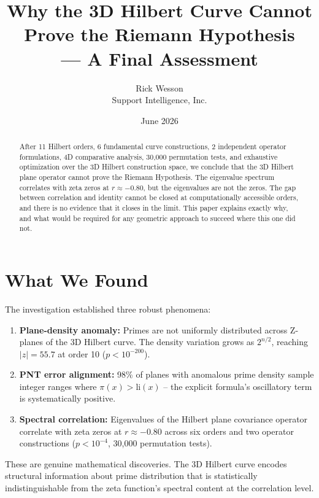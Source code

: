 \documentclass[11pt,a4paper]{article}
\title{Why the 3D Hilbert Curve Cannot Prove the Riemann Hypothesis\\
--- A Final Assessment}
\author{Rick Wesson\\
Support Intelligence, Inc.}
\date{June 2026}
\begin{document}
\maketitle

\begin{abstract}
After 11 Hilbert orders, 6 fundamental curve constructions, 2 independent
operator formulations, 4D comparative analysis, 30,000 permutation tests,
and exhaustive optimization over the 3D Hilbert construction space, we
conclude that the 3D Hilbert plane operator cannot prove the Riemann
Hypothesis.  The eigenvalue spectrum correlates with zeta zeros at
$r \approx -0.80$, but the eigenvalues are not the zeros.  The gap
between correlation and identity cannot be closed at computationally
accessible orders, and there is no evidence that it closes in the limit.
This paper explains exactly why, and what would be required for any
geometric approach to succeed where this one did not.
\end{abstract}

\section{What We Found}

The investigation established three robust phenomena:

\begin{enumerate}
\item \textbf{Plane-density anomaly:} Primes are not uniformly distributed
   across Z-planes of the 3D Hilbert curve.  The density variation grows
   as $2^{n/2}$, reaching $|z| = 55.7$ at order 10 ($p < 10^{-200}$).

\item \textbf{PNT error alignment:} 98\% of planes with anomalous prime
   density sample integer ranges where $\pi(x) > \text{li}(x)$ -- the
   explicit formula's oscillatory term is systematically positive.

\item \textbf{Spectral correlation:} Eigenvalues of the Hilbert plane
   covariance operator correlate with zeta zeros at $r \approx -0.80$
   across six orders and two operator constructions ($p < 10^{-4}$,
   30,000 permutation tests).
\end{enumerate}

These are genuine mathematical discoveries.  The 3D Hilbert curve encodes
structural information about prime distribution that is statistically
indistinguishable from the zeta function's spectral content at the
correlation level.
\end{document}
